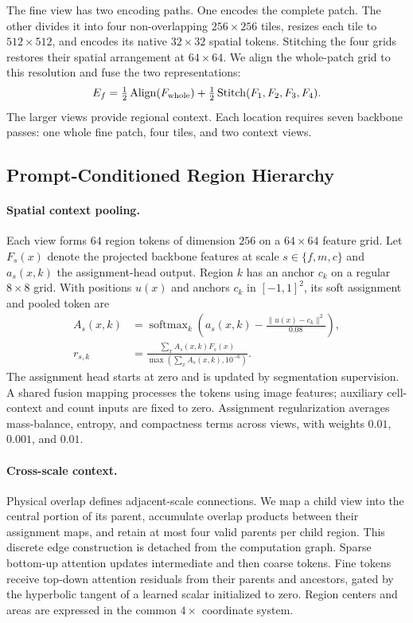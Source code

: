 The fine view has two encoding paths. One encodes the complete patch. The other divides it into four non-overlapping $256\times256$ tiles, resizes each tile to $512\times512$, and encodes its native $32\times32$ spatial tokens. Stitching the four grids restores their spatial arrangement at $64\times64$. We align the whole-patch grid to this resolution and fuse the two representations:
\begin{equation}
 E_f=\tfrac12\operatorname{Align}(F_{\rm whole})
     +\tfrac12\operatorname{Stitch}(F_1,F_2,F_3,F_4).
\label{eq:fusion}
\end{equation}
The larger views provide regional context. Each location requires seven backbone passes: one whole fine patch, four tiles, and two context views.

\subsection{Prompt-Conditioned Region Hierarchy}
\label{sec:regions}
\paragraph{Spatial context pooling.}
Each view forms $64$ region tokens of dimension $256$ on a $64\times64$ feature grid. Let $F_s(x)$ denote the projected backbone features at scale $s\in\{f,m,c\}$ and $a_s(x,k)$ the assignment-head output. Region $k$ has an anchor $c_k$ on a regular $8\times8$ grid. With positions $u(x)$ and anchors $c_k$ in $[-1,1]^2$, its soft assignment and pooled token are
\begin{align}
 A_s(x,k)&=\operatorname{softmax}_{k}\!\left(a_s(x,k)-\frac{\|u(x)-c_k\|^2}{0.08}\right),\label{eq:assignment}\\
 r_{s,k}&=\frac{\sum_x A_s(x,k)F_s(x)}{\max(\sum_x A_s(x,k),10^{-6})}.
\end{align}
The assignment head starts at zero and is updated by segmentation supervision. A shared fusion mapping processes the tokens using image features; auxiliary cell-context and count inputs are fixed to zero. Assignment regularization averages mass-balance, entropy, and compactness terms across views, with weights $0.01$, $0.001$, and $0.01$.

\paragraph{Cross-scale context.}
Physical overlap defines adjacent-scale connections. We map a child view into the central portion of its parent, accumulate overlap products between their assignment maps, and retain at most four valid parents per child region. This discrete edge construction is detached from the computation graph. Sparse bottom-up attention updates intermediate and then coarse tokens. Fine tokens receive top-down attention residuals from their parents and ancestors, gated by the hyperbolic tangent of a learned scalar initialized to zero. Region centers and areas are expressed in the common $4\times$ coordinate system.

